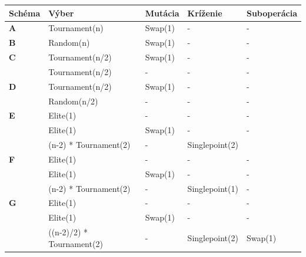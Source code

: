 \begin{table}[!htbp]
\centering
\begin{tabular}{@{}lllll@{}}
\toprule
\textbf{Schéma} & \textbf{Výber}            & \textbf{Mutácia} & \textbf{Kríženie} & \textbf{Suboperácia} \\ \midrule
\textbf{A}      & Tournament(n)             & Swap(1)          & -                 & -                    \\ \midrule
\textbf{B}      & Random(n)                 & Swap(1)          & -                 & -                    \\ \midrule
\textbf{C}      & Tournament(n/2)           & Swap(1)          & -                 & -                    \\
                & Tournament(n/2)           & -                & -                 & -                    \\ \midrule
\textbf{D}      & Tournament(n/2)           & Swap(1)          & -                 & -                    \\
                & Random(n/2)               & -                & -                 & -                    \\ \midrule
\textbf{E}      & Elite(1)                  & -                & -                 & -                    \\
                & Elite(1)                  & Swap(1)          & -                 & -                    \\
                & (n-2) * Tournament(2)     & -                & Singlepoint(2)    &                      \\ \midrule
\textbf{F}      & Elite(1)                  & -                & -                 & -                    \\
                & Elite(1)                  & Swap(1)          & -                 & -                    \\
                & (n-2) * Tournament(2)     & -                & Singlepoint(1)    & -                    \\ \midrule
\textbf{G}      & Elite(1)                  & -                & -                 & -                    \\
                & Elite(1)                  & Swap(1)          & -                 & -                    \\
                & ((n-2)/2) * Tournament(2) & -                & Singlepoint(2)    & Swap(1)              \\ \midrule

\end{tabular}
\end{table}
